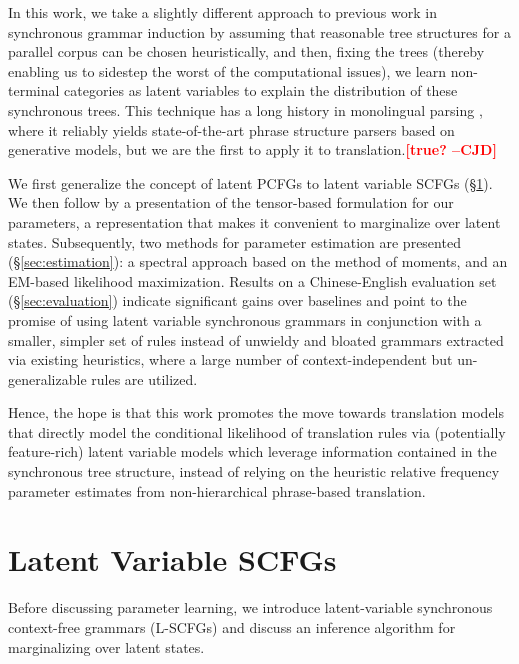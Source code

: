 \documentclass[11pt]{article}
\newcommand{\cjd}[1]{\textcolor{red}{\textbf{[#1 --CJD] }}}
\newcommand{\ignore}[1]{}
\begin{document}
In this work, we take a slightly different approach to previous work in synchronous grammar induction by assuming that reasonable tree structures for a parallel corpus can be chosen heuristically, and then, fixing the trees (thereby enabling us to sidestep the worst of the computational issues), we learn non-terminal categories as latent variables to explain the distribution of these synchronous trees. This technique has a long history in monolingual parsing \cite{Petrov2006,Liang2007,Cohen2012a}, where it reliably yields state-of-the-art phrase structure parsers based on generative models, but we are the first to apply it to translation.\cjd{true?}

\ignore{Our approach refines single-category (``Heiro'') synchronous grammars by incorporating additional context via a latent variable model, featurized over inside and outside sub-trees of synchronous derivation trees for source-target sentence pairs.  }
We first generalize the concept of latent PCFGs to latent variable SCFGs (\S\ref{sec:formalism}). We then follow by a presentation of the tensor-based formulation for our parameters, a representation that makes it convenient to marginalize over latent states.  
Subsequently, two methods for parameter estimation are presented (\S\ref{sec:estimation}): a spectral approach based on the method of moments, and an EM-based likelihood maximization.  
Results on a Chinese-English evaluation set (\S\ref{sec:evaluation}) indicate significant gains over baselines and point to the promise of using latent variable synchronous grammars in conjunction with a smaller, simpler set of rules instead of unwieldy and bloated grammars extracted via existing heuristics, where a large number of context-independent but un-generalizable rules are utilized.  

Hence, the hope is that this work promotes the move towards translation models that directly model the conditional likelihood of translation rules via (potentially feature-rich) latent variable models which leverage information contained in the synchronous tree structure, instead of relying on the heuristic relative frequency parameter estimates \cite{Koehn2003} from non-hierarchical phrase-based translation.  

\section{Latent Variable SCFGs}
\label{sec:formalism}

Before discussing parameter learning, we introduce latent-variable synchronous context-free grammars (L-SCFGs) and discuss an inference algorithm for marginalizing over latent states.  
\end{document}

